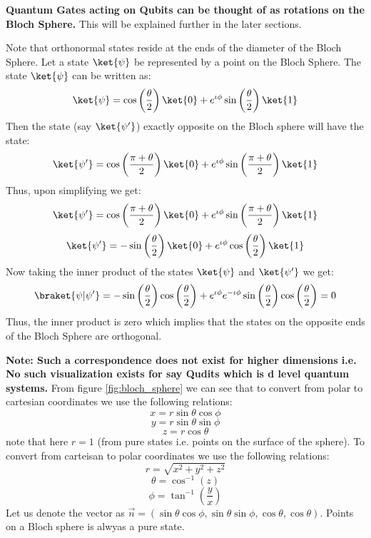 \documentclass[12pt, oneside]{book}
\theoremstyle{definition}
\theoremstyle{definition}
\theoremstyle{remark}
\begin{document}
\textbf{Quantum Gates acting on Qubits can be thought of as rotations on the Bloch Sphere.}
This will be explained further in the later sections.

Note that orthonormal states reside at the ends of the diameter of the Bloch Sphere. 
Let a state $\ket{\psi}$ be represented by a point on the Bloch Sphere. The state $\ket{\psi}$ can be written as:
\[
    \ket{\psi}=\cos\left(\frac{\theta}{2}\right)\ket{0}+e^{\iota \phi}\sin\left(\frac{\theta}{2}\right)\ket{1}
\]
Then the state (say $\ket{\psi'}$) exactly opposite on the Bloch sphere will have the state:
\[
    \ket{\psi'}=\cos\left(\frac{\pi+\theta}{2}\right)\ket{0}+e^{\iota \phi}\sin\left(\frac{\pi+\theta}{2}\right)\ket{1}
\]
Thus, upon simplifying we get:
\[
    \ket{\psi'}=\cos\left(\frac{\pi+\theta}{2}\right)\ket{0}+e^{\iota \phi}\sin\left(\frac{\pi+\theta}{2}\right)\ket{1}
\]
\[
    \ket{\psi'}=-\sin \left(\frac{\theta}{2}\right)\ket{0}+e^{\iota \phi}\cos\left(\frac{\theta}{2}\right)\ket{1}
\]
Now taking the inner product of the states $\ket{\psi}$ and $\ket{\psi'}$ we get:
\[
    \braket{\psi|\psi'}=-\sin\left(\frac{\theta}{2}\right)\cos\left(\frac{\theta}{2}\right)+e^{\iota \phi}e^{-\iota \phi}\sin\left(\frac{\theta}{2}\right)\cos\left(\frac{\theta}{2}\right)=0
\]
Thus, the inner product is zero which implies that the states on the opposite ends of the Bloch Sphere are orthogonal.

\textbf{Note: Such a correspondence does not exist for higher dimensions i.e. No such visualization exists for say Qudits which is d level quantum systems.}
From figure \ref{fig:bloch_sphere} we can see that to convert from polar to cartesian coordinates we use the following relations:
\[
    x=r\sin\theta\cos\phi
\]
\[
    y=r\sin\theta\sin\phi
\]
\[
    z=r\cos\theta
\]
note that here $r=1$ (from pure states i.e. points on the surface of the sphere). To convert from carteisan to polar coordinates we use the following relations:
\[
    r=\sqrt{x^2+y^2+z^2}
\]
\[
    \theta=\cos^{-1}(z)
\]
\[
    \phi=\tan^{-1}\left(\frac{y}{x}\right)
\]
Let us denote the vector as $\vec{n}=(\sin\theta \cos \phi, \sin \theta \sin \phi, \cos \theta, \cos \theta)$.
Points on a Bloch sphere is alwyas a pure state.
\end{document}
